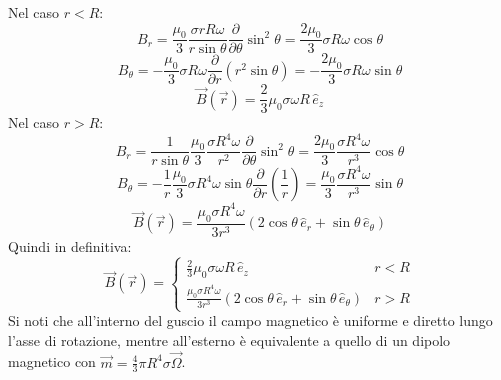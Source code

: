 Nel caso $ r < R $:
\begin{equation}
	B_r = \displaystyle\frac{\mu_0}{3} \displaystyle\frac{\sigma r R \omega}{r \sin\theta} \displaystyle\frac{\partial}{\partial\theta} \sin^2\theta = \displaystyle\frac{2\mu_0}{3} \sigma R \omega \cos\theta
	\label{eq:}
\end{equation}
\begin{equation}
	B_{\theta} = -\displaystyle\frac{\mu_0}{3} \sigma R \omega \displaystyle\frac{\partial}{\partial r} (r^2 \sin\theta) = -\displaystyle\frac{2\mu_0}{3} \sigma R \omega \sin\theta
	\label{eq:}
\end{equation}
\begin{equation}
	\vec{B}(\vec{r}) = \displaystyle\frac{2}{3} \mu_0 \sigma\omega R\,\hat{e}_z
	\label{eq:}
\end{equation}
Nel caso $ r > R $:
\begin{equation}
	B_r = \displaystyle\frac{1}{r \sin\theta} \displaystyle\frac{\mu_0}{3} \displaystyle\frac{\sigma R^4 \omega}{r^2} \displaystyle\frac{\partial}{\partial\theta} \sin^2\theta = \displaystyle\frac{2\mu_0}{3} \displaystyle\frac{\sigma R^4 \omega}{r^3} \cos\theta
	\label{eq:}
\end{equation}
\begin{equation}
	B_{\theta} = -\displaystyle\frac{1}{r} \displaystyle\frac{\mu_0}{3} \sigma R^4 \omega \sin\theta \displaystyle\frac{\partial}{\partial r} \left(\displaystyle\frac{1}{r}\right) = \displaystyle\frac{\mu_0}{3} \displaystyle\frac{\sigma R^4 \omega}{r^3} \sin\theta
	\label{eq:}
\end{equation}
\begin{equation}
	\vec{B}(\vec{r}) = \displaystyle\frac{\mu_0 \sigma R^4 \omega}{3 r^3} \left(2\cos\theta \,\hat{e}_r + \sin\theta \,\hat{e}_{\theta}\right)
	\label{eq:}
\end{equation}
Quindi in definitiva:
\begin{equation}
	\vec{B}(\vec{r}) =
	\begin{cases}
		\frac{2}{3} \mu_0 \sigma\omega R\,\hat{e}_z & r < R \\ 
		\displaystyle\frac{\mu_0 \sigma R^4 \omega}{3 r^3} \left(2\cos\theta \,\hat{e}_r + \sin\theta \,\hat{e}_{\theta}\right) & r > R
	\end{cases}
	\label{eq:mag-sf}
\end{equation}
Si noti che all'interno del guscio il campo magnetico è uniforme e diretto lungo l'asse di rotazione, mentre all'esterno è equivalente a quello di un dipolo magnetico con $ \vec{m} = \frac{4}{3} \pi R^4 \sigma \vec{\Omega} $.
